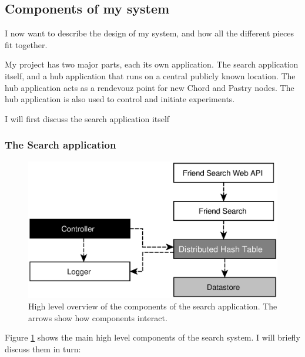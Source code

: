 
\subsection{Components of my system}
I now want to describe the design of my system, and how all the different pieces fit together.

My project has two major parts, each its own application. The search application itself, and a hub application that runs on a central publicly known location. The hub application acts as a rendevouz point for new Chord and Pastry nodes. The hub application is also used to control and initiate experiments.

\mbox{}

I will first discuss the search application itself


\subsubsection{The Search application}

\begin{figure}[htb]
\begin{center}
	\includegraphics[width=0.9\linewidth]{illustrations/ComponentOverview.eps}
\caption{High level overview of the components of the search application. The arrows show how components interact.}
\label{figComponents}
\end{center}
\end{figure}

Figure \ref{figComponents} shows the main high level components of the search system. I will briefly discuss them in turn:

